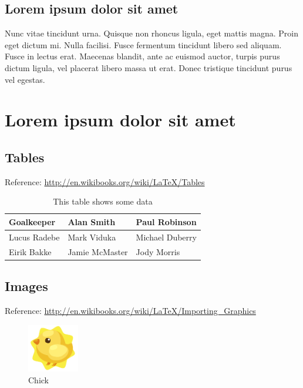 \documentclass{projetofinal-dcc}
\begin{document}
\section{Lorem ipsum dolor sit amet}\label{sec:LABEL_CHP_1_SEC_J}
Nunc vitae tincidunt urna. Quisque non rhoncus ligula, eget mattis magna. Proin eget dictum mi. Nulla facilisi. Fusce fermentum tincidunt libero sed aliquam. Fusce in lectus erat. Maecenas blandit, ante ac euismod auctor, turpis purus dictum ligula, vel placerat libero massa ut erat. Donec tristique tincidunt purus vel egestas.

\chapter{Lorem ipsum dolor sit amet}\label{chp:LABEL_CHP_2}

\section{Tables}\label{sec:LABEL_CHP_2_SEC_A}
Reference: \url{http://en.wikibooks.org/wiki/LaTeX/Tables}

\begin{table}[!h]
  \centering
  \begin{tabular}{ |l|l|l| }
    \hline
      Goalkeeper & Alan Smith & Paul Robinson \\
    \hline
      Lucus Radebe &  Mark Viduka & Michael Duberry \\
    \hline
      Eirik Bakke & Jamie McMaster & Jody Morris \\
    \hline
  \end{tabular}
  \caption{This table shows some data}
  \label{tab:LABEL_TAB_1}
\end{table}

\section{Images}\label{sec:LABEL_CHP_2_SEC_B}
Reference: \url{http://en.wikibooks.org/wiki/LaTeX/Importing_Graphics}

\begin{figure}
  \centering
  \includegraphics[width=0.2\textwidth]{../imagens/chick.png}
  \caption{Chick}
  \label{fig:LABEL_FIG_1}
\end{figure}
\end{document}
